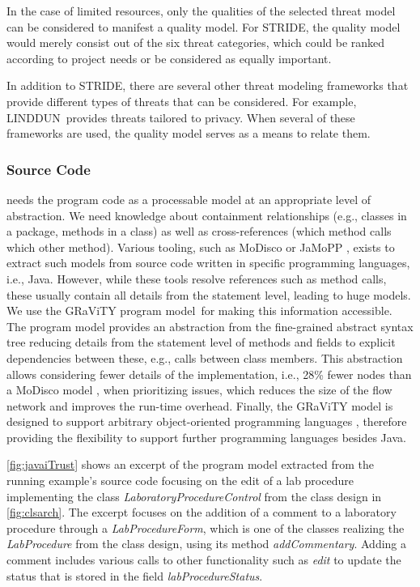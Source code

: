 In the case of limited resources, only the qualities of the selected threat model can be considered to manifest a quality model.
For STRIDE, the quality model would merely consist out of the six threat categories, which could be ranked according to project needs or be considered as equally important.

In addition to STRIDE, there are several other threat modeling frameworks that provide different types of threats that can be considered.
For example, LINDDUN\,\cite{deng2011privacy} provides threats tailored to privacy. When several of these frameworks are used, the quality model serves as a means to relate them.

\subsubsection{Source Code}
\appr{} needs the program code as a processable model at an appropriate level of abstraction.
We need knowledge about containment relationships (e.g., classes in a package, methods in a class) as well as cross-references (which method calls which other method).
Various tooling, such as MoDisco \cite{modisco} or JaMoPP \cite{jamopp}, exists to extract such models from source code written in specific programming languages, i.e., Java.
However, while these tools resolve references such as method calls, these usually contain all details from the statement level, leading to huge models.
We use the GRaViTY program model\,\cite{PKLS2015,Peldszus2022,Peldszus2024} for making this information accessible.
The program model provides an abstraction from the fine-grained abstract syntax tree reducing details from the statement level of methods and fields to explicit dependencies between these, e.g., calls between class members.
This abstraction allows considering fewer details %
of the implementation, i.e., 28\% fewer nodes than a MoDisco model \cite{Peldszus2024}, when prioritizing issues, which reduces the size of the flow network and improves the run-time overhead.
Finally, the GRaViTY model is designed to support arbitrary object-oriented programming languages \cite{PKLS2015}, therefore providing the flexibility to support further programming languages besides Java.

\autoref{fig:javaiTrust} shows an excerpt of the program model extracted from the running example's source code focusing on the edit of a lab procedure implementing the class \textit{LaboratoryProcedureControl} from the class design in \autoref{fig:clsarch}.
The excerpt focuses on the addition of a comment to a laboratory procedure through a \textit{LabProcedureForm}, which is one of the classes realizing the \textit{LabProcedure} from the class design, using its method \textit{addCommentary}.
Adding a comment includes various calls to other functionality such as \textit{edit} to update the status that is stored in the field \textit{labProcedureStatus}.

